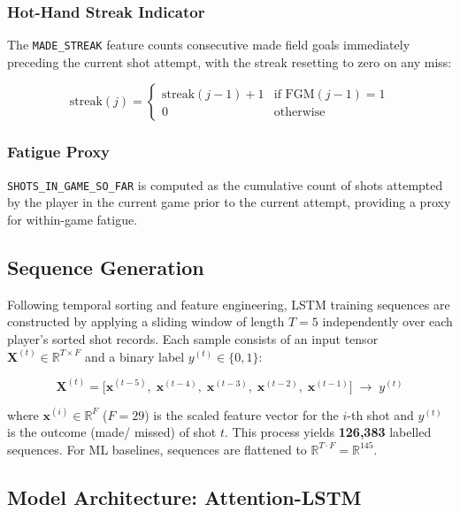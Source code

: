 \documentclass[conference]{IEEEtran}
\begin{document}
\subsubsection{Hot-Hand Streak Indicator}
The \texttt{MADE\_STREAK} feature counts consecutive made field goals
immediately preceding the current shot attempt, with the streak resetting
to zero on any miss:

\begin{equation}
\text{streak}(j) =
\begin{cases}
\text{streak}(j-1) + 1 & \text{if } \text{FGM}(j-1) = 1 \\
0                       & \text{otherwise}
\end{cases}
\end{equation}

\subsubsection{Fatigue Proxy}
\texttt{SHOTS\_IN\_GAME\_SO\_FAR} is computed as the cumulative count of
shots attempted by the player in the current game prior to the current
attempt, providing a proxy for within-game fatigue.

\subsection{Sequence Generation}

Following temporal sorting and feature engineering, LSTM training
sequences are constructed by applying a sliding window of length $T=5$
independently over each player's sorted shot records.  Each sample
consists of an input tensor $\mathbf{X}^{(t)} \in \mathbb{R}^{T \times F}$
and a binary label $y^{(t)} \in \{0,1\}$:

\begin{equation}
\mathbf{X}^{(t)} =
\bigl[\mathbf{x}^{(t-5)},\;\mathbf{x}^{(t-4)},\;\mathbf{x}^{(t-3)},\;
      \mathbf{x}^{(t-2)},\;\mathbf{x}^{(t-1)}\bigr]
\;\rightarrow\; y^{(t)}
\end{equation}

where $\mathbf{x}^{(i)} \in \mathbb{R}^{F}$ ($F\!=\!29$) is the scaled
feature vector for the $i$-th shot and $y^{(t)}$ is the outcome (made/
missed) of shot $t$.  This process yields \textbf{126{,}383} labelled
sequences.  For ML baselines, sequences are flattened to
$\mathbb{R}^{T \cdot F} = \mathbb{R}^{145}$.

\subsection{Model Architecture: Attention-LSTM}
\end{document}
